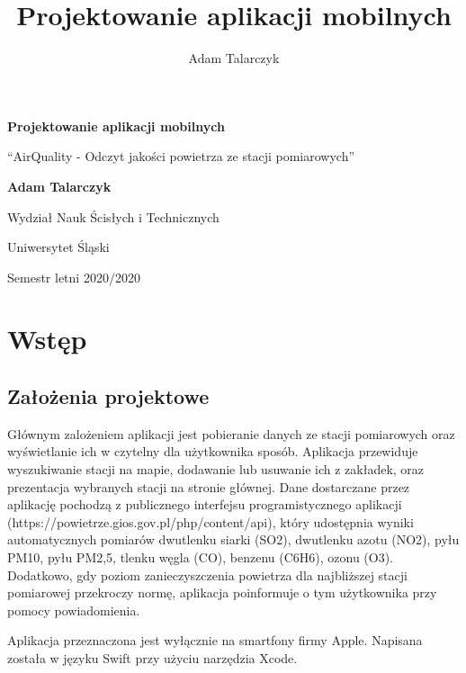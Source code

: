 \documentclass[a4paper,11pt,titlepage]{article}
\author{Adam Talarczyk}
\title{Projektowanie aplikacji mobilnych}
\begin{document}
\begin{titlepage}
    \begin{center}
        \vspace*{1cm}
 
        \Huge
        \textbf{Projektowanie aplikacji mobilnych}
 
        \vspace{0.5cm}
        \LARGE
        ``AirQuality - Odczyt jakości powietrza ze stacji pomiarowych''
 
        \vspace{1.5cm}
 
        \textbf{Adam Talarczyk}
 
        \vfill
 
        \vspace{0.8cm}
 
        \Large
        Wydział Nauk Ścisłych i Technicznych

        Uniwersytet Śląski

	Semestr letni 2020/2020
 
    \end{center}
\end{titlepage}
\newpage
\tableofcontents
\newpage

\section{Wstęp}
\subsection{Założenia projektowe}
Głównym zalożeniem aplikacji jest pobieranie danych ze stacji pomiarowych oraz wyświetlanie ich w czytelny dla użytkownika sposób. Aplikacja przewiduje wyszukiwanie stacji na mapie, dodawanie lub usuwanie ich z zakładek, oraz prezentacja wybranych stacji na stronie głównej. Dane dostarczane przez aplikację pochodzą z publicznego interfejsu programistycznego aplikacji (https://powietrze.gios.gov.pl/php/content/api), który udostępnia wyniki automatycznych pomiarów dwutlenku siarki (SO2), dwutlenku azotu (NO2), pyłu PM10, pyłu PM2,5, tlenku węgla (CO), benzenu (C6H6), ozonu (O3). Dodatkowo, gdy poziom zanieczyszczenia powietrza dla najbliższej stacji pomiarowej przekroczy normę, aplikacja poinformuje o tym użytkownika przy pomocy powiadomienia.

Aplikacja przeznaczona jest wyłącznie na smartfony firmy Apple. Napisana została w języku Swift przy użyciu narzędzia Xcode.
\end{document}
